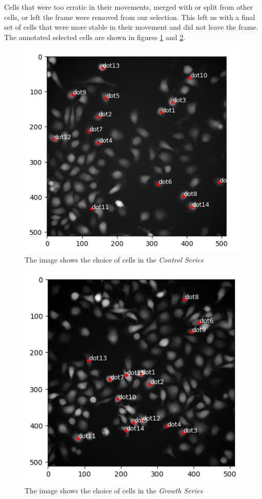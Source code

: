 \documentclass{article}
\begin{document}
Cells that were too erratic in their movements, merged with or split from other cells, or left the frame were removed from our selection. This left us with a final set of cells that were more stable in their movement and did not leave the frame. The annotated selected cells are shown in figures \ref{fig:ChoiceofCells-ControlSeries} and \ref{fig:ChoiceofCells-GrowthSeries}. 

\begin{figure}[h!]
\centering
\includegraphics[width=0.7\linewidth]{Images/final_points_chosen.png}
\caption{\label{fig:ChoiceofCells-ControlSeries}The image shows the choice of cells in the \emph{Control Series}}
\end{figure}

\begin{figure}[h!]
\centering
\includegraphics[width=0.7\linewidth]{Images/final_points_chosen_growth.png}
\caption{\label{fig:ChoiceofCells-GrowthSeries}The image shows the choice of cells in the \emph{Growth Series}}
\end{figure}
\end{document}
